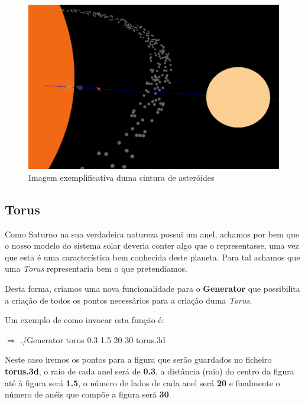 \documentclass[a4paper]{article}
\begin{document}
\begin{figure}[H]
\centering
\includegraphics[scale=0.45]{cintura.png}
\caption{Imagem exemplificativa duma cintura de asteróides}
\label{img:cintura}
\end{figure}



\subsection{Torus}

Como Saturno na sua verdadeira natureza possui um anel, achamos por bem que o nosso modelo do sistema solar deveria conter algo que o representasse, uma vez que esta é uma característica bem conhecida deste planeta. Para tal achamos que uma \emph{Torus} representaria bem o que pretendíamos.

Desta forma, criamos uma nova funcionalidade para o \textbf{Generator} que possibilita a criação de todos os pontos necessários para a criação duma \emph{Torus}.

Um exemplo de como invocar esta função é:

 \vspace{0.5cm}

$\Rightarrow$ ./Generator torus 0.3 1.5 20 30 torus.3d

 \vspace{0.5cm}
 
 Neste caso iremos os pontos para a figura que serão guardados no ficheiro \textbf{torus.3d}, o raio de cada anel será de \textbf{0.3}, a distância (raio) do centro da figura até à figura será \textbf{1.5}, o número de lados de cada anel será \textbf{20} e finalmente o número de anéis que compõe a figura será \textbf{30}.
 
\end{document}
